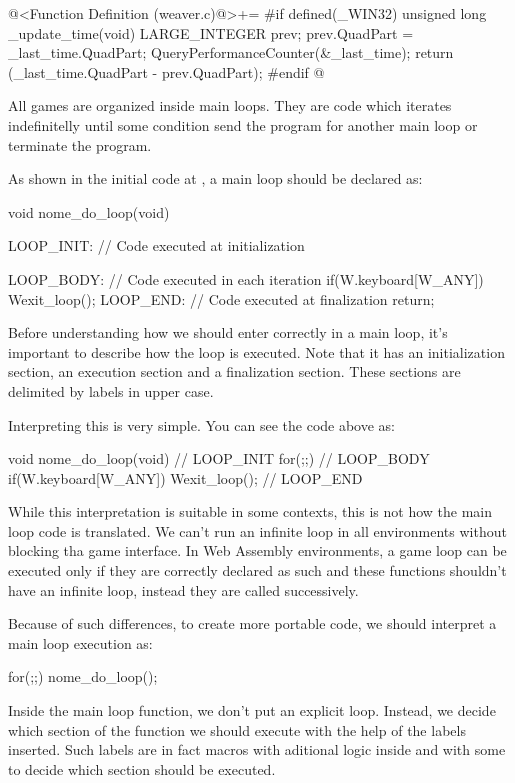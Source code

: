 \iniciocodigo
@<Function Definition (weaver.c)@>+=
#if defined(_WIN32)
unsigned long _update_time(void){
  LARGE_INTEGER prev;
  prev.QuadPart = _last_time.QuadPart;
  QueryPerformanceCounter(&_last_time);
  return (_last_time.QuadPart - prev.QuadPart);
}
#endif
@
\fimcodigo


All games are organized inside main loops. They are code which
iterates indefinitelly until some condition send the program for
another main loop or terminate the program.

As shown in the initial code at , a main loop
should be declared as:

\alinhaverbatim
void nome\_do\_loop(void){
 LOOP\_INIT: // Code executed at initialization

 LOOP\_BODY: // Code executed in each iteration
    if(W.keyboard[W\_ANY])
        Wexit\_loop();
 LOOP\_END: // Code executed at finalization
    return;
}
\alinhanormal

Before understanding how we should enter correctly in a main loop,
it's important to describe how the loop is executed. Note that it has
an initialization section, an execution section and a finalization
section. These sections are delimited by labels in upper case.

Interpreting this is very simple. You can see the code above as:

\alinhaverbatim
void nome\_do\_loop(void){
  // LOOP\_INIT
  for(;;){
    // LOOP\_BODY
    if(W.keyboard[W\_ANY])
        Wexit\_loop();
  }
  // LOOP\_END
}
\alinhanormal

While this interpretation is suitable in some contexts, this is not
how the main loop code is translated. We can't run an infinite loop in
all environments without blocking tha game interface. In Web Assembly
environments, a game loop can be executed only if they are correctly
declared as such and these functions shouldn't have an infinite loop,
instead they are called successively.

Because of such differences, to create more portable code, we should
interpret a main loop execution as:

\alinhaverbatim
for(;;)
  nome\_do\_loop();
\alinhanormal

Inside the main loop function, we don't put an explicit loop. Instead,
we decide which section of the function we should execute with the
help of the labels inserted. Such labels are in fact macros with
aditional logic inside and with some  to decide which
section should be executed.

